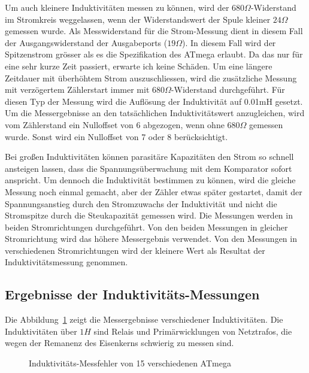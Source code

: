 Um auch kleinere Induktivitäten messen zu können, wird der \(680 \Omega\)-Widerstand im Stromkreis weggelassen,
wenn der Widerstandswert der Spule kleiner \(24 \Omega\) gemessen wurde. Als Messwiderstand für die Strom-Messung
dient in diesem Fall der Ausgangswiderstand der Ausgabeports (\(19 \Omega\)). In diesem Fall wird der Spitzenstrom grösser
als es die Spezifikation des ATmega erlaubt. Da das nur für eine sehr kurze Zeit passiert, erwarte ich keine Schäden.
Um eine längere Zeitdauer mit überhöhtem Strom auszuschliessen, wird die zusätzliche Messung mit 
verzögertem Zählerstart immer mit \(680 \Omega\)-Widerstand durchgeführt.
Für diesen Typ der Messung wird die Auflösung der Induktivität auf 0.01mH gesetzt.
Um die Messergebnisse an den tatsächlichen Induktivitätswert anzugleichen, wird vom Zählerstand ein
Nulloffset von 6 abgezogen, wenn ohne \(680 \Omega\) gemessen wurde. Sonst wird ein Nulloffset von 7 oder 8 berücksichtigt.


Bei großen Induktivitäten können parasitäre Kapazitäten den Strom so schnell ansteigen lassen, dass
die Spannungsüberwachung mit dem Komparator sofort anspricht. Um dennoch die Induktivität bestimmen zu
können, wird die gleiche Messung noch einmal gemacht, aber der Zähler etwas später gestartet, damit
der Spannungsanstieg durch den Stromzuwachs der Induktivität und nicht die Stromspitze durch die
Steukapazität gemessen wird.
Die Messungen werden in beiden Stromrichtungen durchgeführt.
Von den beiden Messungen in gleicher Stromrichtung wird das höhere Messergebnis verwendet.
Von den Messungen in verschiedenen Stromrichtungen wird der kleinere Wert als Resultat der Induktivitätsmessung genommen.

\subsection{Ergebnisse der Induktivitäts-Messungen}
Die Abbildung~\ref{fig:Induct328p} zeigt die Messergebnisse verschiedener Induktivitäten.
Die Induktivitäten über \(1 H\) sind Relais und Primärwicklungen von Netztrafos, die wegen
der Remanenz des Eisenkerns schwierig zu messen sind.

\begin{figure}[H]
\centering

\caption{Induktivitäts-Messfehler von 15 verschiedenen ATmega}
\label{fig:Induct328p}
\end{figure}
